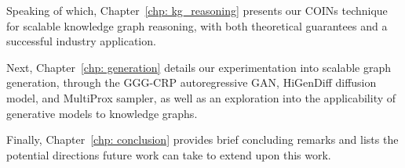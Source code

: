 Speaking of which, Chapter~\ref{chp: kg_reasoning} presents our COINs technique for scalable knowledge graph reasoning, with both theoretical guarantees and a successful industry application.

Next, Chapter~\ref{chp: generation} details our experimentation into scalable graph generation, through the GGG-CRP autoregressive GAN, HiGenDiff diffusion model, and MultiProx sampler, as well as an exploration into the applicability of generative models to knowledge graphs. 

Finally, Chapter~\ref{chp: conclusion} provides brief concluding remarks and lists the potential directions future work can take to extend upon this work.